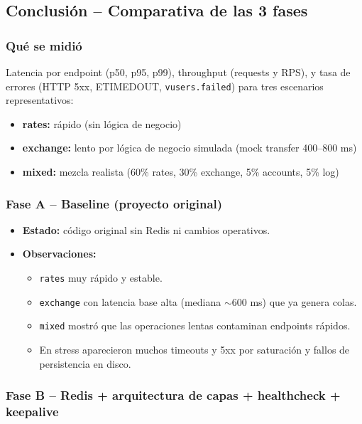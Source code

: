 \subsection{Conclusión -- Comparativa de las 3 fases}

\subsubsection{Qué se midió}

Latencia por endpoint (p50, p95, p99), throughput (requests y RPS), y tasa de errores (HTTP 5xx, ETIMEDOUT, \texttt{vusers.failed}) para tres escenarios representativos:

\begin{itemize}[leftmargin=*]
    \item \textbf{rates:} rápido (sin lógica de negocio)
    \item \textbf{exchange:} lento por lógica de negocio simulada (mock transfer 400--800 ms)
    \item \textbf{mixed:} mezcla realista (60\% rates, 30\% exchange, 5\% accounts, 5\% log)
\end{itemize}

\subsubsection{Fase A -- Baseline (proyecto original)}

\begin{itemize}[leftmargin=*]
    \item \textbf{Estado:} código original sin Redis ni cambios operativos.

    \item \textbf{Observaciones:}
    \begin{itemize}[leftmargin=2em]
        \item \texttt{rates} muy rápido y estable.
        \item \texttt{exchange} con latencia base alta (mediana $\sim$600 ms) que ya genera colas.
        \item \texttt{mixed} mostró que las operaciones lentas contaminan endpoints rápidos.
        \item En stress aparecieron muchos timeouts y 5xx por saturación y fallos de persistencia en disco.
    \end{itemize}
\end{itemize}

\subsubsection{Fase B -- Redis + arquitectura de capas + healthcheck + keepalive}


